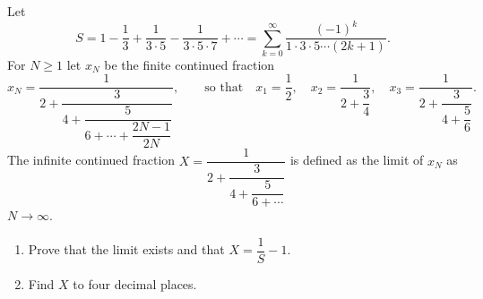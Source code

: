 Let
\[S=1-\dfrac{1}{3}+\dfrac{1}{3\cdot5}-\dfrac{1}{3\cdot5\cdot7}+\cdots=\sum_{k=0}^{\infty}\dfrac{(-1)^k}{1\cdot3\cdot5\cdots(2k+1)} .\]
For $N\ge1$ let $x_N$ be the finite continued fraction
\[x_N=\dfrac{1}{2+\dfrac{3}{4+\dfrac{5}{6+\cdots+\dfrac{2N-1}{2N}}}},\qquad\text{so that}\quad x_1=\dfrac{1}{2},\quad x_2=\dfrac{1}{2+\dfrac{3}{4}},\quad x_3=\dfrac{1}{2+\dfrac{3}{4+\dfrac{5}{6}}} .\]
The infinite continued fraction $X=\dfrac{1}{2+\dfrac{3}{4+\dfrac{5}{6+\cdots}}}$ is defined as the limit of $x_N$ as $N\to\infty$.
\begin{enumerate}
\item[(a)] Prove that the limit exists and that $X=\dfrac{1}{S}-1$.
\item[(b)] Find $X$ to four decimal places.
\end{enumerate}

